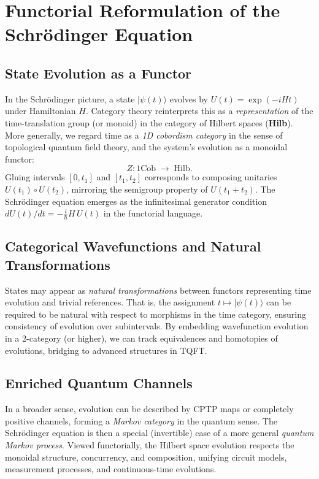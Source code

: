 \documentclass[12pt]{article}
\begin{document}
\section{Functorial Reformulation of the Schr\"odinger Equation}
\subsection{State Evolution as a Functor}
In the Schr\"odinger picture, a state $\lvert \psi(t)\rangle$
evolves by $U(t) = \exp(-iHt)$ under Hamiltonian $H$. Category
theory reinterprets this as a \emph{representation} of the
time-translation group (or monoid) in the category of Hilbert spaces
(\textbf{Hilb}). More generally, we regard time as a \emph{1D
cobordism category} in the sense of topological quantum field theory,
and the system's evolution as a monoidal functor:
\[
Z \colon 1\mathrm{Cob} \; \to \; \mathrm{Hilb}.
\]
Gluing intervals $[0,t_1]$ and $[t_1,t_2]$ corresponds to composing
unitaries $U(t_1) \circ U(t_2)$, mirroring the semigroup property
of $U(t_1 + t_2)$. The Schr\"odinger equation emerges as the
infinitesimal generator condition $dU(t)/dt = -\frac{i}{\hbar}H\,U(t)$
in the functorial language.

\subsection{Categorical Wavefunctions and Natural Transformations}
States may appear as \emph{natural transformations} between functors
representing time evolution and trivial references. That is, the
assignment $t \mapsto |\psi(t)\rangle$ can be required to be natural
with respect to morphisms in the time category, ensuring consistency
of evolution over subintervals. By embedding wavefunction evolution
in a 2-category (or higher), we can track equivalences and homotopies
of evolutions, bridging to advanced structures in TQFT.

\subsection{Enriched Quantum Channels}
In a broader sense, evolution can be described by CPTP maps or
completely positive channels, forming a \emph{Markov category} in
the quantum sense. The Schr\"odinger equation is then a special
(invertible) case of a more general \emph{quantum Markov process}.
Viewed functorially, the Hilbert space evolution respects the
monoidal structure, concurrency, and composition, unifying circuit
models, measurement processes, and continuous-time evolutions.
\end{document}
